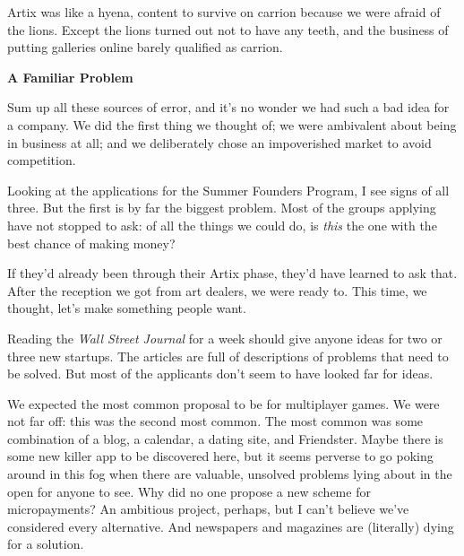 Artix
                    was like a hyena, content to survive on carrion because we
                    were afraid of the lions. Except the lions turned out not to
                    have any teeth, and the business of putting galleries online
                    barely qualified as carrion.

\textbf{A Familiar Problem}

Sum up all these sources of error, and it's no
                    wonder we had such a bad idea for a company. We did the
                    first thing we thought of; we were ambivalent about being in
                    business at all; and we deliberately chose an impoverished
                    market to avoid competition.

Looking at the
                    applications for the Summer Founders Program, I see signs of
                    all three. But the first is by far the biggest problem. Most
                    of the groups applying have not stopped to ask: of all the
                    things we could do, is \emph{this} the one with the best
                    chance of making money?

If they'd already been
                    through their Artix phase, they'd have learned to ask that.
                    After the reception we got from art dealers, we were ready
                    to. This time, we thought, let's make something people
                    want.

Reading the \emph{Wall Street Journal} for
                    a week should give anyone ideas for two or three new
                    startups. The articles are full of descriptions of problems
                    that need to be solved. But most of the applicants don't
                    seem to have looked far for ideas.

We expected
                    the most common proposal to be for multiplayer games. We
                    were not far off: this was the second most common. The most
                    common was some combination of a blog, a calendar, a dating
                    site, and Friendster. Maybe there is some new killer app to
                    be discovered here, but it seems perverse to go poking
                    around in this fog when there are valuable, unsolved
                    problems lying about in the open for anyone to see. Why did
                    no one propose a new scheme for micropayments? An ambitious
                    project, perhaps, but I can't believe we've considered every
                    alternative. And newspapers and magazines are (literally)
                    dying for a solution.

